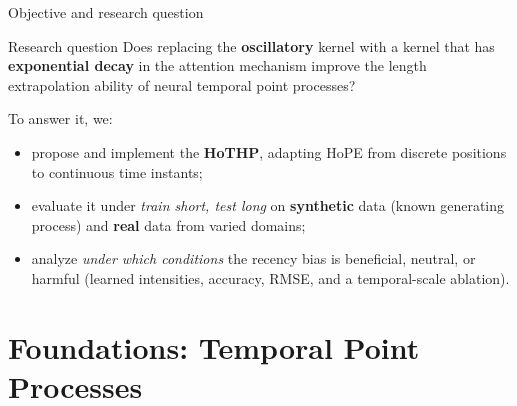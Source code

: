 \documentclass[aspectratio=169]{beamer}
\begin{document}
\begin{frame}{Objective and research question}
  \begin{block}{Research question}
    Does replacing the \textbf{oscillatory} kernel with a kernel that has
    \textbf{exponential decay} in the attention mechanism improve the length
    extrapolation ability of neural temporal point processes?
  \end{block}
  \vspace{0.5em}
  To answer it, we:
  \begin{itemize}
    \item propose and implement the \textbf{HoTHP}, adapting HoPE from discrete
          positions to continuous time instants;
    \item evaluate it under \emph{train short, test long} on \textbf{synthetic}
          data (known generating process) and \textbf{real} data from varied
          domains;
    \item analyze \emph{under which conditions} the recency bias is beneficial,
          neutral, or harmful (learned intensities, accuracy, RMSE, and a
          temporal-scale ablation).
  \end{itemize}
\end{frame}

\section{Foundations: Temporal Point Processes}
\end{document}
